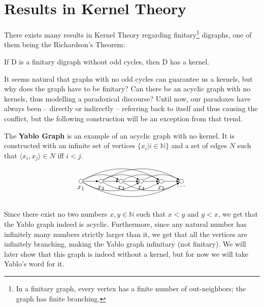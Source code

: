 \section{Results in Kernel Theory}
\label{sec:Results in Kernel Theory}
There exists many results in Kernel Theory regarding finitary\footnote{In a finitary graph, every vertex has a finite number of out-neighbors; the graph has finite branching.} digraphs, one of them being the Richardson's Theorem:\\

\begin{theorem}
  \cite{am-richardson} If D is a finitary digraph without odd cycles, then D has a kernel.
\end{theorem}
It seems natural that graphs with no odd cycles can guarantee us a kernels, but why does the graph have to be finitary?
Can there be an acyclic graph with no kernels, thus modelling a paradoxical discourse?
Until now, our paradoxes have always been -- directly or indirectly -- referring back to itself and thus causing the conflict, but the following construction will be an exception from that trend.

The \textbf{Yablo Graph} \cite{analysis-yablo} is an example of an acyclic graph with no kernel. It is constructed with an infinite set of vertices $\{ x_i | i \in \mathbb{N} \}$ and a set of edges $N$ such that $\langle x_i, x_j \rangle \in N$ iff $i < j$.
\[
  \begin{tikzpicture}
    [
    point/.style={circle,draw,inner sep=0pt,minimum size=2mm},
    collection/.style={thick,rectangle,draw,inner sep=0pt,minimum height=14mm, minimum width= 9mm}
    ]
    \node (1) at (0,1) [point,label=below:$x_1$] {};
    \node (2) at (1,1) [point,label=below:$x_2$] {};
    \node (3) at (2,1) [point,label=below:$x_3$] {};
    \node (4) at (3,1) [point,label=below:$x_4$] {};
    \node (5) at (4,1) [point,label=below:$x_5$] {};
    \node (6) at (5,1) [point,label=below:$\dots$] {};
    \draw [-latex] (1) to (2);
    \draw [-latex] (2) to (3);
    \draw [-latex] (3) to (4);
    \draw [-latex] (4) to (5);
    \draw [-latex] (5) to (6);
    \draw [-latex, bend left] (1) to (3);
    \draw [-latex, bend left] (2) to (4);
    \draw [-latex, bend left] (3) to (5);
    \draw [-latex, bend left] (4) to (6);
    \draw [-latex, bend right] (1) to (4);
    \draw [-latex, bend right] (2) to (5);
    \draw [-latex, bend right] (3) to (6);
    \draw [-latex, bend left] (1) to (5);
    \draw [-latex, bend left] (2) to (6);
    \draw [-latex, bend right] (1) to (6);
  \end{tikzpicture}
\]

Since there exist no two numbers $x,y \in \mathbb{N}$ such that $x < y$ and $y < x$, we get that the Yablo graph indeed is acyclic.
Furthermore, since any natural number has infinitely many numbers strictly larger than it, we get that all the vertices are infinitely branching, making the Yablo graph infinitary (not finitary).
We will later show that this graph is indeed without a kernel, but for now we will take Yablo's word \cite{analysis-yablo} for it.
